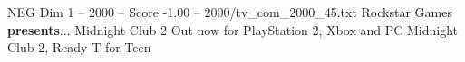 \begin{textsample}{NEG Dim 1 – 2000 – Score -1.00 – 2000/tv\_com\_2000\_45.txt}  \label{ex:f1_neg_026}
Rockstar Games \textbf{presents}...
Midnight Club 2 Out now for PlayStation 2, Xbox and PC Midnight Club 2, Ready T for Teen

\end{textsample}
